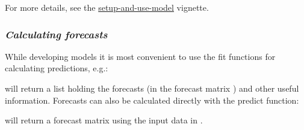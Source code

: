 For more details, see the \href{https://onlineforecasting.org/vignettes/setup-and-use-model.html#input-transformations}{setup-and-use-model} vignette.




\subsubsection{\it Calculating forecasts}

While developing models it is most convenient to use the fit functions for
calculating predictions, e.g.: 
\begin{knitrout}
\color{fgcolor}\begin{kframe}
\begin{alltt}
\hlopt{\$} \hlkwb{<-} \hlopt{:}
 \hlkwb{<-} \hlopt{\$}
\end{alltt}
\end{kframe}
\end{knitrout}
\noindent will return a list holding the forecasts (in the forecast matrix
) and other useful information. Forecasts can also be calculated
directly with the predict function:
\begin{knitrout}
\color{fgcolor}\begin{kframe}
\begin{alltt}
\hlopt{\$}
\end{alltt}
\end{kframe}
\end{knitrout}
\noindent will return a forecast matrix using the input data in .


